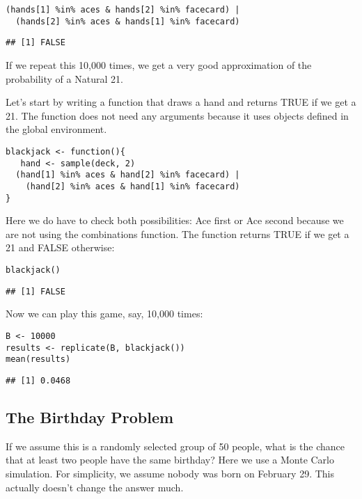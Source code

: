 \documentclass[
]{article}
\begin{document}
\begin{verbatim}
(hands[1] %in% aces & hands[2] %in% facecard) | 
  (hands[2] %in% aces & hands[1] %in% facecard)
\end{verbatim}

\begin{verbatim}
## [1] FALSE
\end{verbatim}

If we repeat this 10,000 times, we get a very good approximation of the
probability of a Natural 21.

Let's start by writing a function that draws a hand and returns TRUE if
we get a 21. The function does not need any arguments because it uses
objects defined in the global environment.

\begin{verbatim}
blackjack <- function(){
   hand <- sample(deck, 2)
  (hand[1] %in% aces & hand[2] %in% facecard) | 
    (hand[2] %in% aces & hand[1] %in% facecard)
}
\end{verbatim}

Here we do have to check both possibilities: Ace first or Ace second
because we are not using the combinations function. The function returns
TRUE if we get a 21 and FALSE otherwise:

\begin{verbatim}
blackjack()
\end{verbatim}

\begin{verbatim}
## [1] FALSE
\end{verbatim}

Now we can play this game, say, 10,000 times:

\begin{verbatim}
B <- 10000
results <- replicate(B, blackjack())
mean(results)
\end{verbatim}

\begin{verbatim}
## [1] 0.0468
\end{verbatim}

\hypertarget{the-birthday-problem}{%
\subsection{The Birthday Problem}\label{the-birthday-problem}}

If we assume this is a randomly selected group of 50 people, what is the
chance that at least two people have the same birthday? Here we use a
Monte Carlo simulation. For simplicity, we assume nobody was born on
February 29. This actually doesn't change the answer much.
\end{document}

